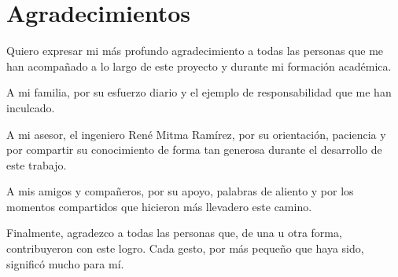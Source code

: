 \chapter*{Agradecimientos}

Quiero expresar mi más profundo agradecimiento a todas las personas que me han acompañado a lo largo de este proyecto y durante mi formación académica.

A mi familia, por su esfuerzo diario y el ejemplo de responsabilidad que me han inculcado.

A mi asesor, el ingeniero René Mitma Ramírez, por su orientación, paciencia y por compartir su conocimiento de forma tan generosa durante el desarrollo de este trabajo.

A mis amigos y compañeros, por su apoyo, palabras de aliento y por los momentos compartidos que hicieron más llevadero este camino.

Finalmente, agradezco a todas las personas que, de una u otra forma, contribuyeron con este logro. Cada gesto, por más pequeño que haya sido, significó mucho para mí.
